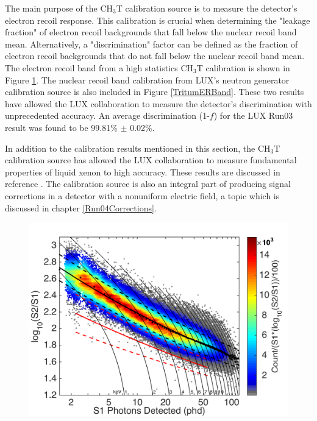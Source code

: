 \documentclass[a4paper,12pt]{article}
\begin{document}
{The main purpose of the CH$_3$T calibration source is to measure the detector's electron recoil response.  This calibration is crucial when determining the "leakage fraction" of electron recoil backgrounds that fall below the nuclear recoil band mean.  Alternatively, a "discrimination" factor can be defined as the fraction of electron recoil backgrounds that do not fall below the nuclear recoil band mean.  The electron recoil band from a high statistics CH$_3$T calibration is shown in Figure \ref{TritiumERBand}.  The nuclear recoil band calibration from LUX's neutron generator calibration source is also included in Figure \ref{TritumERBand}. These two results have allowed the LUX collaboration to measure the detector's discrimination with unprecedented accuracy.  An average discrimination (1-$f$) for the LUX Run03 result was found to be 99.81\% $\pm$ 0.02\%.

In addition to the calibration results mentioned in this section, the CH$_3$T calibration source has allowed the LUX collaboration to measure fundamental properties of liquid xenon to high accuracy.  These results are discussed in reference \cite{TritiumPaper}.  The calibration source is also an integral part of producing signal corrections in a detector with a nonuniform electric field, a topic which is discussed in chapter \ref{Run04Corrections}.

\newpage 

\begin{figure} [!h]
\includegraphics[scale=.35]{TritiumERBand.pdf} 
\label{TritiumERBand}
\end{figure}

}
\end{document}
